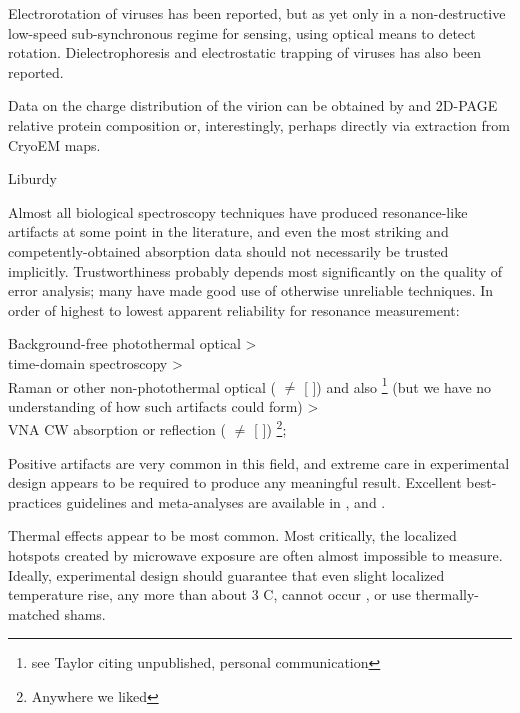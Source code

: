 \documentclass[paper.tex]{subfiles}
\begin{document}
Electrorotation\cite{Electrorotation1988}\cite{Electrorotation1997} of viruses has been reported\cite{Analysis2004}\cite{New1999}\cite{comprehensive2001}, but as yet only in a non-destructive low-speed sub-synchronous regime for sensing, using optical means to detect rotation. Dielectrophoresis and electrostatic trapping of viruses has also been reported.

Data on the charge distribution of the virion can be obtained by and 2D-PAGE relative protein composition or, interestingly, perhaps directly via extraction from CryoEM maps.




Liburdy

Almost all biological spectroscopy techniques have produced resonance-like artifacts at some point in the literature, and even the most striking and competently-obtained absorption data should not necessarily be trusted implicitly. Trustworthiness probably depends most significantly on the quality of error analysis; many have made good use of otherwise unreliable techniques. In order of highest to lowest apparent reliability for resonance measurement:

Background-free photothermal optical \cite{Microwave1993a}\cite{Broadband1988} >\\ time-domain spectroscopy\cite{Time2003}\cite{Dielectric2004}\cite{Microwave1994} >\\ Raman or other non-photothermal optical (\cite{optical1983} $\neq$ [\cite{Resonances1987} \cite{Dielectric1989}]) and also \footnote{see Taylor \cite{mechanisms1981} citing unpublished, personal communication} (but we have no understanding of how such artifacts could form) >\\ VNA CW absorption or reflection (\cite{Microwave1982} $\neq$ [\cite{Resonances1987} \cite{Dielectric1989}]) \cite{Substitution1982} \cite{Millimeter1980} \footnote{Anywhere we liked};

Positive artifacts are very common in this field, and extreme care in experimental design appears to be required to produce any meaningful result. Excellent best-practices guidelines and meta-analyses are available in \cite{Biological2016} \cite{Comprehensive2018} \cite{Funding2019}, \cite{chou1996radio} and \cite{Effects2016}.

Thermal effects appear to be most common. Most critically, the localized hotspots created by microwave exposure are often almost impossible to measure. Ideally, experimental design should guarantee that even slight localized temperature rise, any more than about 3 C, cannot occur \cite{Sharp1983}\cite{DNA2004}, or use thermally-matched shams\cite{Basic1983}. \cite{Effects1951}
\end{document}
